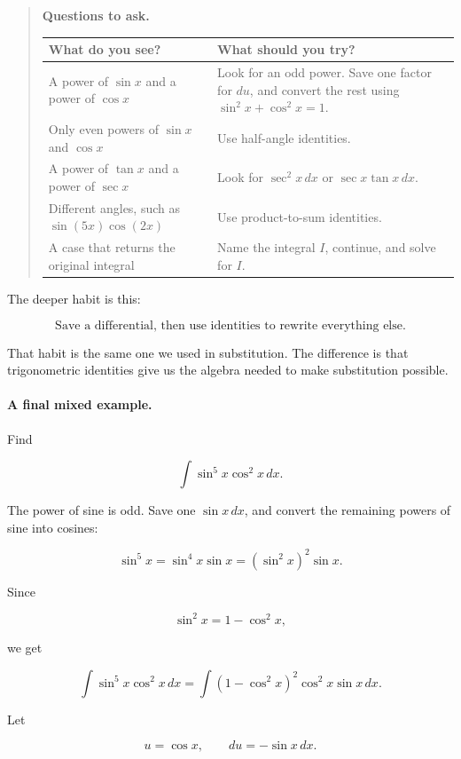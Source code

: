 \begin{quote}
\textbf{Questions to ask.}

\begin{center}
\begin{tabular}{p{}|p{}}
\textbf{What do you see?} & \textbf{What should you try?} \\ \hline
A power of \(\sin x\) and a power of \(\cos x\) & Look for an odd power.  Save one factor for \(du\), and convert the rest using \(\sin^2x+\cos^2x=1\). \\[6pt]
Only even powers of \(\sin x\) and \(\cos x\) & Use half-angle identities. \\[6pt]
A power of \(\tan x\) and a power of \(\sec x\) & Look for \(\sec^2x\,dx\) or \(\sec x\tan x\,dx\). \\[6pt]
Different angles, such as \(\sin(5x)\cos(2x)\) & Use product-to-sum identities. \\[6pt]
A case that returns the original integral & Name the integral \(I\), continue, and solve for \(I\).
\end{tabular}
\end{center}
\end{quote}

The deeper habit is this:

\[
\boxed{
\text{Save a differential, then use identities to rewrite everything else.}
}
\]

That habit is the same one we used in substitution.  The difference is that
trigonometric identities give us the algebra needed to make substitution possible.

\paragraph{A final mixed example.}
Find

\[
\int \sin^5 x\cos^2 x\,dx.
\]

The power of sine is odd.  Save one \(\sin x\,dx\), and convert the remaining powers
of sine into cosines:

\[
\sin^5 x=\sin^4 x\sin x=(\sin^2 x)^2\sin x.
\]

Since

\[
\sin^2 x=1-\cos^2 x,
\]

we get

\[
\int \sin^5 x\cos^2 x\,dx
=
\int (1-\cos^2 x)^2\cos^2 x\sin x\,dx.
\]

Let

\[
u=\cos x,
\qquad
du=-\sin x\,dx.
\]

